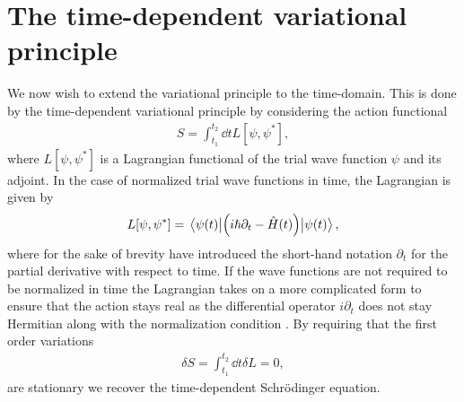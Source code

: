     \section{The time-dependent variational principle}
        We now wish to extend the variational principle to the time-domain.
        This is done by the time-dependent variational principle by considering
        the action functional
        \begin{align}
            S = \int_{t_1}^{t_2}\dd t L[\psi, \psi^{*}],
        \end{align}
        where $L[\psi, \psi^{*}]$ is a Lagrangian functional of the trial wave
        function $\psi$ and its adjoint.
        In the case of normalized trial wave functions in time, the Lagrangian
        is given by
        \begin{align}
            L[\psi, \psi^{*}]
            =
            \mel{\psi(t)}{
                \left( 
                    i\hslash\partial_t - \hat{H}(t)
                 \right)
            }{\psi(t)},
        \end{align}
        where for the sake of brevity have introduced the short-hand notation
        $\partial_t$ for the partial derivative with respect to time.
        If the wave functions are not required to be normalized in time the
        Lagrangian takes on a more complicated form to ensure that the action
        stays real as the differential operator $i\partial_t$ does not stay
        Hermitian along with the normalization condition
        \cite{kramer1981geometry}.
        By requiring that the first order variations
        \begin{align}
            \delta S
            = \int_{t_1}^{t_2}\dd t \delta L
            = 0,
            \label{eq:stationary-action}
        \end{align}
        are stationary we recover the time-dependent Schrödinger equation.
